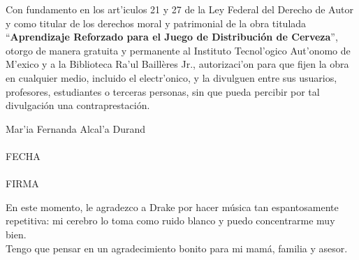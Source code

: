 
\newpage
\mbox{}
\thispagestyle{empty} %

\newpage
\thispagestyle{empty}
Con fundamento en los art'iculos 21 y 27 de la Ley Federal del
Derecho de Autor y como titular de los derechos moral y patrimonial de la obra titulada ``\textbf{Aprendizaje Reforzado para el Juego de Distribuci\'on de Cerveza}'', otorgo de manera gratuita y permanente al Instituto Tecnol'ogico Aut'onomo de M'exico y a la Biblioteca Ra'ul Baill\`eres Jr., autorizaci'on para que fijen la obra en cualquier medio, incluido el electr'onico, y la divulguen entre sus usuarios, profesores, estudiantes o terceras personas, sin que pueda percibir por tal divulgación una contraprestación.

\vspace{20 mm}
\begin{center}
Mar'ia Fernanda Alcal'a Durand\\

\vspace{20 mm}
\makebox[2in]{\hrulefill}\\
FECHA\\
\vspace{20 mm}
\makebox[2in]{\hrulefill}\\
FIRMA
\end{center}

\newpage
\mbox{}
\thispagestyle{empty} %



En este momento, le agradezco a Drake por hacer m\'usica tan espantosamente repetitiva: mi cerebro lo toma como ruido blanco y puedo concentrarme muy bien.\\

Tengo que pensar en un agradecimiento bonito para mi mam\'a, familia y asesor.

\newpage
\mbox{}
\thispagestyle{empty} %
